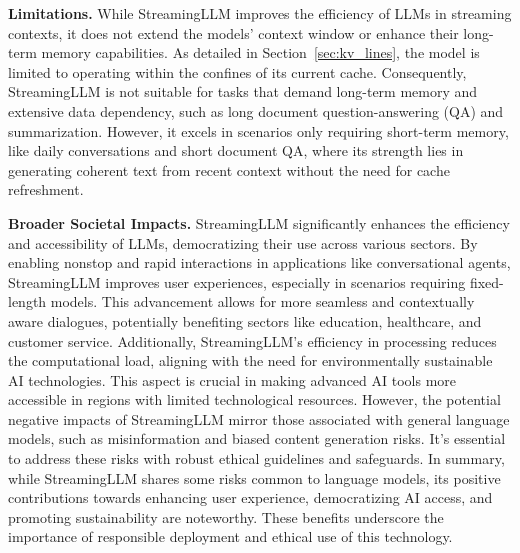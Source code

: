 \documentclass{article} \usepackage{iclr2024_conference,times}
\def\method{StreamingLLM\xspace}
\begin{document}
\textbf{Limitations.}
While \method improves the efficiency of LLMs in streaming contexts, it does not extend the models' context window or enhance their long-term memory capabilities. As detailed in Section~\ref{sec:kv_lines}, the model is limited to operating within the confines of its current cache. Consequently, \method is not suitable for tasks that demand long-term memory and extensive data dependency, such as long document question-answering (QA) and summarization. However, it excels in scenarios only requiring short-term memory, like daily conversations and short document QA, where its strength lies in generating coherent text from recent context without the need for cache refreshment.

\textbf{Broader Societal Impacts.}
\method significantly enhances the efficiency and accessibility of LLMs, democratizing their use across various sectors. By enabling nonstop and rapid interactions in applications like conversational agents, \method improves user experiences, especially in scenarios requiring fixed-length models. This advancement allows for more seamless and contextually aware dialogues, potentially benefiting sectors like education, healthcare, and customer service.
Additionally, \method's efficiency in processing reduces the computational load, aligning with the need for environmentally sustainable AI technologies. This aspect is crucial in making advanced AI tools more accessible in regions with limited technological resources.
However, the potential negative impacts of \method mirror those associated with general language models, such as misinformation and biased content generation risks. It's essential to address these risks with robust ethical guidelines and safeguards.
In summary, while \method shares some risks common to language models, its positive contributions towards enhancing user experience, democratizing AI access, and promoting sustainability are noteworthy. These benefits underscore the importance of responsible deployment and ethical use of this technology.
\end{document}

